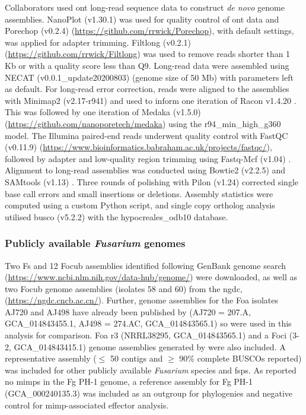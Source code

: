 Collaborators used \Ac{ont} long-read sequence data to construct \textit{de novo} genome assemblies. NanoPlot (v1.30.1) \parencite{DeCoster2018} was used for quality control of \ac{ont} data and Porechop (v0.2.4) (\href{https://github.com/rrwick/Porechop}{https://github.com/rrwic\-k/Porechop}), with default settings, was applied for adapter trimming. Filtlong (v0.2.1)  (\href{https://github.com/rrwick/Filtlong}{https://github.com/rrwick/Filtlong}) was used to remove reads shorter than 1 Kb or with a quality score less than Q9. Long-read data were assembled using NECAT (v0.0.1\_update20200803) \parencite{Chen2021} (genome size of 50 Mb) with parameters left as default. For long-read error correction, reads were aligned to the assemblies with Minimap2 (v2.17-r941) \parencite{Li2018} and used to inform one iteration of Racon v1.4.20 \parencite{Vaser2017}. This was followed by one iteration of Medaka (v1.5.0) (\href{https://github.com/nanoporetech/medaka}{https://github.com/nanoporetech/medaka}) using the r94\_min\_high\_g360 model. The Illumina paired-end reads underwent quality control with FastQC (v0.11.9) (\href{https://www.bioinformatics.babraham.ac.uk/projects/fastqc/}{https://www.bioinformatics.babra\-ham.ac.uk/projects/fastqc/}), followed by adapter and low-quality region trimming using Fastq-Mcf (v1.04) \parencite{Aronesty2013}. Alignment to long-read assemblies was conducted using Bowtie2 (v2.2.5) \parencite{Langmead2012} and SAMtools (v1.13) \Parencite{Danecek2021}. Three rounds of polishing with Pilon (v1.24) \parencite{Walker2014} corrected single base call errors and small insertions or deletions. Assembly statistics were computed using a custom Python script, and single copy ortholog analysis utilised \ac{busco} (v5.2.2) \parencite{Simao2015} with the hypocreales\_odb10 database.

\subsubsection{Publicly available \textit{Fusarium} genomes}

Two \ac{Fs} and 12 \ac{Focub} assemblies identified following GenBank genome search (\href{https://www.ncbi.nlm.nih.gov/data-hub/genome}{https://ww\-w.ncbi.nlm.nih.gov/data-hub/genome/}) were downloaded, as well as two \ac{Focub} genome assemblies (isolates 58 and 60) from the \ac{ngdc}, (\href{https://ngdc.cncb.ac.cn}{https:/\-/ngdc.cncb.ac.cn/}). Further, genome assemblies for the \ac{Foa} isolates AJ720 and AJ498 have already been published by \textcite{Henry2020} (AJ720 = 207.A, GCA\_014843455.1,  AJ498 = 274.AC, GCA\_014843565.1) so were used in this analysis for comparison. \Ac{Foa} \ac{r3} (NRRL38295, GCA\_014843565.1) and a \ac{Foci} (3-2, GCA\_014843415.1) genome assemblies generated by \textcite{Henry2020} were also included. A representative assembly (\( \leq \) 50 contigs and \(\geq \) 90\% complete BUSCOs reported) was included for other publicly available \textit{Fusarium} species and \acp{fsp}. As \textcite{Schmidt2013} reported no \acp{mimp} in the \ac{Fg} PH-1 genome, a reference assembly for \ac{Fg} PH-1 (GCA\_000240135.3) was included as an outgroup for phylogenies and negative control for \ac{mimp}-associated effector analysis.

